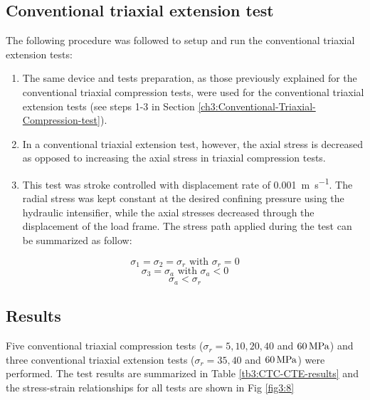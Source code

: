 \subsection{Conventional triaxial extension test}

The following procedure was followed to setup and run the conventional triaxial extension tests:

\begin{enumerate}
    \item The same device and tests preparation, as those previously explained for the conventional triaxial compression tests, were used for the conventional triaxial extension tests (see steps 1-3 in Section \ref{ch3:Conventional-Triaxial-Compression-test}).
    \item In a conventional triaxial extension test, however, the axial stress is decreased as opposed to increasing the axial stress in triaxial compression tests. 
    \item This test was stroke controlled with displacement rate of \SI{0.001}{\meter\per\second}. The radial stress was kept constant at the desired confining pressure using the hydraulic intensifier, while the axial stresses decreased through the displacement of the load frame. The stress path applied during the test can be summarized as follow:
\end{enumerate}
\begin{equation}
    \sigma_1 = \sigma_2 = \sigma_r  \text{ with } \sigma_r = 0 
\end{equation}
\begin{equation}
    \sigma_3 = \sigma_a \text{ with } \sigma_a < 0  
\end{equation}
\begin{equation}
    \sigma_a < \sigma_r
\end{equation}

\subsection{Results}

Five conventional triaxial compression tests ($\sigma_r =  5,10,20,40$ and $\SIlist{60}{MPa}$) and three conventional triaxial extension tests ($\sigma_r = 35,40$ and $\SIlist{60}{MPa}$) were performed. The test results are summarized in Table \ref{tb3:CTC-CTE-results} and the stress-strain relationships for all tests are shown in Fig \ref{fig3:8}

